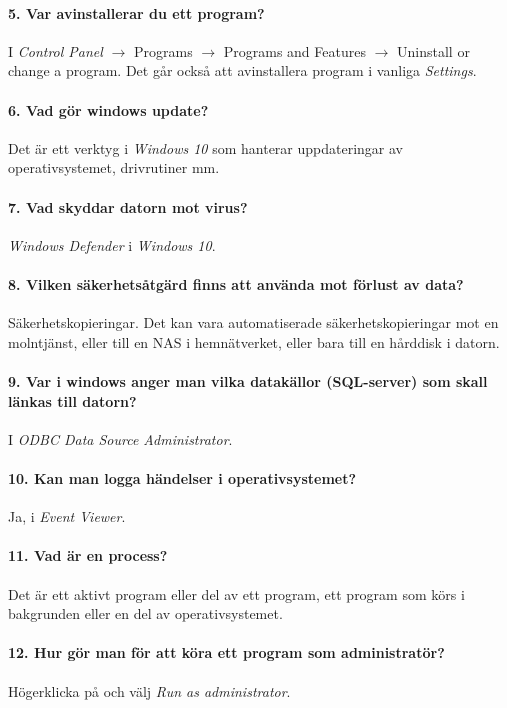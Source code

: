 \paragraph{5. Var avinstallerar du ett program?}
I \textit{Control Panel} $\rightarrow$ Programs $\rightarrow$ Programs and Features $\rightarrow$ Uninstall or change a program. Det går också att avinstallera program i vanliga \textit{Settings}.

\paragraph{6. Vad gör windows update?}
Det är ett verktyg i \textit{Windows 10} som hanterar uppdateringar av operativsystemet, drivrutiner mm.

\paragraph{7. Vad skyddar datorn mot virus?}
\textit{Windows Defender} i \textit{Windows 10}.

\paragraph{8. Vilken säkerhetsåtgärd finns att använda mot förlust av data?}
Säkerhetskopieringar. Det kan vara automatiserade säkerhetskopieringar mot en molntjänst, eller till en NAS i hemnätverket, eller bara till en hårddisk i datorn.

\paragraph{9. Var i windows anger man vilka datakällor (SQL-server) som skall länkas till datorn?}
I \textit{ODBC Data Source Administrator}.

\paragraph{10. Kan man logga händelser i operativsystemet?}
Ja, i \textit{Event Viewer}.

\paragraph{11. Vad är en process?}
Det är ett aktivt program eller del av ett program, ett program som körs i bakgrunden eller en del av operativsystemet.

\paragraph{12. Hur gör man för att köra ett program som administratör?}
Högerklicka på och välj \textit{Run as administrator}.

